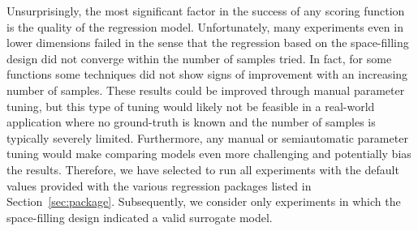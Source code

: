  Unsurprisingly, the most significant factor in the success of any scoring function is the quality of the regression model.
%
Unfortunately, many experiments even in lower dimensions failed in the sense that the regression based on the space-filling design did not converge within the number of samples tried.
%
In fact, for some functions some techniques did not show signs of improvement with an increasing number of samples.
%
These results could be improved through manual parameter tuning, but this type of tuning would likely not be feasible in a real-world application where no ground-truth is known and the number of samples is typically severely limited.
%
Furthermore, any manual or semiautomatic parameter tuning would make comparing models even more challenging and potentially bias the results.
%
Therefore, we have selected to run all experiments with the default values provided with the various regression packages listed in Section~\ref{sec:package}.
%
Subsequently, we consider only experiments in which the space-filling design indicated a valid surrogate model.

